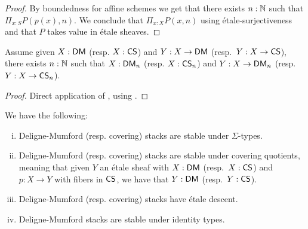 \begin{proof}
By boundedness for affine schemes we get that there exists $n:\mathbb{N}$ such that $\Pi_{x:S}P(p(x),n)$. We conclude that $\Pi_{x:X}P(x,n)$ using étale-surjectiveness and that $P$ takes value in étale sheaves.
\end{proof}


\begin{lemma}\label{DM-family-bounded}
Assume given $X:\mathsf{DM}$ (resp. $X:\mathsf{CS}$) and $Y:X\to \mathsf{DM}$ (resp.\ $Y:X\to \mathsf{CS}$), there exists $n:\mathbb{N}$ such that $X:\mathsf{DM}_n$ (resp. $X:\mathsf{CS}_n$) and $Y:X\to \mathsf{DM}_n$ (resp.\ $Y:X\to \mathsf{CS}_n$).
\end{lemma}

\begin{proof}
Direct application of , using .
\end{proof}

\begin{proposition}\label{DM-stack-stability}
We have the following:

\begin{enumerate}[(i)]
\item Deligne-Mumford (resp. covering) stacks are stable under $\Sigma$-types.
\item Deligne-Mumford (resp. covering) stacks are stable under covering quotients, meaning that given $Y$ an étale sheaf with $X:\mathsf{DM}$ (resp.\ $X:\mathsf{CS}$) and $p:X\to Y$ with fibers in $\mathsf{CS}$, we have that $Y:\mathsf{DM}$ (resp.\ $Y:\mathsf{CS}$).
\item Deligne-Mumford (resp. covering) stacks have étale descent.
\item Deligne-Mumford stacks are stable under identity types.
\end{enumerate}
\end{proposition}

